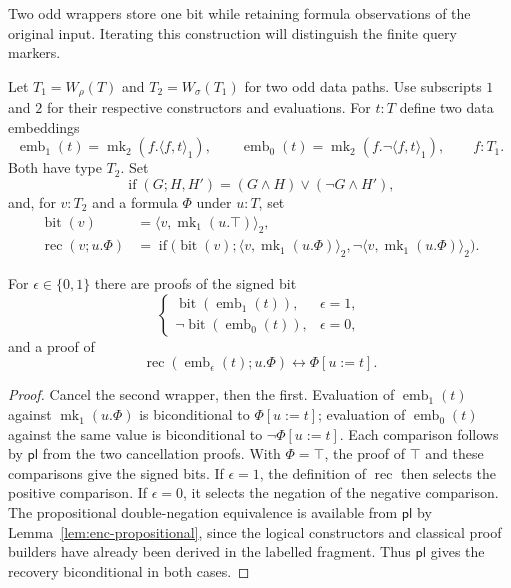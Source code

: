 Two odd wrappers store one bit while retaining formula observations of
the original input. Iterating this construction will distinguish the
finite query markers.

\begin{definition}
\label{chan-double}
Let $T_1=W_{\rho}(T)$ and $T_2=W_{\sigma}(T_1)$ for two odd data paths.
Use subscripts $1$ and $2$ for their respective constructors and
evaluations.  For $t:T$ define two data embeddings
\[
 \operatorname{emb}_1(t)
   =\operatorname{mk}_2(f.\langle f,t\rangle_1),\qquad
 \operatorname{emb}_0(t)
   =\operatorname{mk}_2(f.\neg\langle f,t\rangle_1),
 \qquad f:T_1.
\]
Both have type $T_2$.  Set
\[
 \operatorname{if}(G;H,H')=(G\land H)\lor(\neg G\land H'),
\]
and, for $v:T_2$ and a formula $\Phi$ under $u:T$, set
\[
\begin{aligned}
 \operatorname{bit}(v)
   &=\langle v,\operatorname{mk}_1(u.\top)\rangle_2,\\
 \operatorname{rec}(v;u.\Phi)
   &=\operatorname{if}\bigl(\operatorname{bit}(v);
          \langle v,\operatorname{mk}_1(u.\Phi)\rangle_2,
          \neg\langle v,\operatorname{mk}_1(u.\Phi)\rangle_2\bigr).
\end{aligned}
\]
\end{definition}

\begin{lemma}
\label{chan-double-laws}
For $\epsilon\in\{0,1\}$ there are proofs of the signed bit
\[
 \begin{cases}
  \operatorname{bit}(\operatorname{emb}_1(t)),&\epsilon=1,\\
  \neg\operatorname{bit}(\operatorname{emb}_0(t)),&\epsilon=0,
 \end{cases}
\]
and a proof of
\[
 \operatorname{rec}(\operatorname{emb}_{\epsilon}(t);u.\Phi)
       \leftrightarrow\Phi[u:=t].
\]
\end{lemma}

\begin{proof}
Cancel the second wrapper, then the first.  Evaluation of
$\operatorname{emb}_1(t)$ against $\operatorname{mk}_1(u.\Phi)$ is
biconditional to $\Phi[u:=t]$; evaluation of
$\operatorname{emb}_0(t)$ against the same value is biconditional to
$\neg\Phi[u:=t]$.  Each comparison follows by $\mathsf{pl}$ from the two
cancellation proofs.  With $\Phi=\top$, the proof of $\top$ and these
comparisons give the signed bits.  If $\epsilon=1$, the definition of
$\operatorname{rec}$ then selects the positive comparison.  If
$\epsilon=0$, it selects the negation of the negative comparison.  The
propositional double-negation equivalence is available from
$\mathsf{pl}$ by Lemma~\ref{lem:enc-propositional}, since the logical
constructors and classical proof builders have already been derived in
the labelled fragment.  Thus
$\mathsf{pl}$ gives the recovery biconditional in both cases.
\end{proof}

